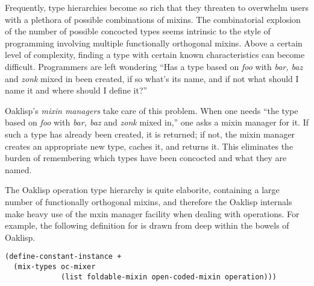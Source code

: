 Frequently, type hierarchies become so rich that they threaten to
overwhelm users with a plethora of possible combinations of mixins.
The combinatorial explosion of the number of possible concocted types
seems intrinsic to the style of programming involving multiple
functionally orthogonal mixins.  Above a certain level of complexity,
finding a type with certain known characteristics can become
difficult.  Programmers are left wondering ``Has a type based on 
\emph{foo} with \emph{bar, baz} and \emph{zonk} mixed in been created, if so
what's its name, and if not what should I name it and where should I
define it?''

Oaklisp's \emph{mixin managers} take care of this problem.  When one
needs ``the type based on \emph{foo} with \emph{bar, baz} and \emph{zonk}
mixed in,'' one asks a mixin manager for it.  If such a type has
already been created, it is returned; if not, the mixin manager
creates an appropriate new type, caches it, and returns it.  This
eliminates the burden of remembering which types have been concocted
and what they are named.



The Oaklisp operation type hierarchy is quite elaborite, containing a
large number of functionally orthogonal mixins, and therefore the
Oaklisp internals make heavy use of the mxin manager facility when
dealing with operations.  For example, the following definition for
\df{+} is drawn from deep within the bowels of Oaklisp.
\begin{verbatim}
(define-constant-instance +
  (mix-types oc-mixer
             (list foldable-mixin open-coded-mixin operation)))
\end{verbatim}
